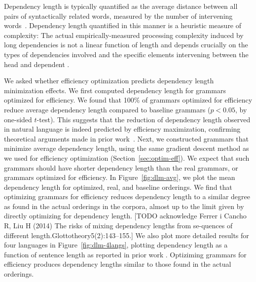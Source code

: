 \documentclass[10pt,twoside,lineno]{article}
\begin{document}
Dependency length is typically quantified as the average distance between all pairs of syntactically related words, measured by the number of intervening words~\cite{futrell2015largescale}.
Dependency length quantified in this manner is a heuristic measure of complexity:
The actual empirically-measured processing complexity induced by long dependencies is not a linear function of length and depends crucially on the types of dependencies involved \cite{demberg2008data} and the specific elements intervening between the head and dependent \cite{gibson1998linguistic,gibson2000dependency,lewis2005activationbased}.

We asked whether efficiency optimization predicts dependency length minimization effects.
We first computed dependency length for grammars optimized for efficiency.
We found that 100\% of grammars optimized for efficiency reduce average dependency length compared to baseline grammars ($p < 0.05$, by one-sided $t$-test). 
This suggests that the reduction of dependency length observed in natural language is indeed predicted by efficiency maximization, confirming theoretical arguments made in prior work~\cite{hawkins1994performance,hawkins2004efficiency,futrell2017memory, futrell2017generalizing}.
Next, we constructed grammars that minimize average dependency length, using the same gradient descent method as we used for efficiency optimization (Section~\ref{sec:optim-eff}).
We expect that such grammars should have shorter dependency length than the real grammars, or grammars optimized for efficiency.
In Figure~\ref{fig:dlm-avg}, we plot the mean dependency length for optimized, real, and baseline orderings.
We find that optimizing grammars for efficiency reduces dependency length to a similar degree as found in the actual orderings in the corpora, almost up to the limit given by directly optimizing for dependency length. [TODO acknowledge  Ferrer i Cancho R, Liu H (2014) The risks of mixing dependency lengths from se-quences of different length.Glottotheory5(2):143–155.]
We also plot more detailed results for four languages in Figure~\ref{fig:dlm-4langs}, plotting dependency length as a function of sentence length as reported in prior work \cite{futrell2015largescale}.
Optiziming grammars for efficiency produces dependency lengths similar to those found in the actual orderings.
\end{document}

